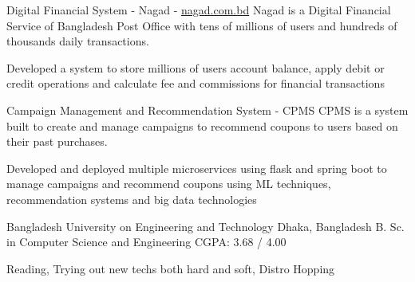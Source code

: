 \documentclass[10pt]{article}
\begin{document}
\headedsectionthree
{Digital Financial System - Nagad - {\href{https://nagad.com.bd/}{nagad.com.bd}}}{}
{Nagad is a Digital Financial Service of Bangladesh Post Office with tens of millions of users and hundreds of thousands daily transactions.}
{\vspace{-2.4ex}
\begin{circlist}	
	\item Developed a system to store millions of users account balance, apply debit or credit operations and calculate fee and commissions for financial transactions
\end{circlist}
\begin{indentsection}
\end{indentsection}
}
\headedsectionthree
{Campaign Management and Recommendation System - CPMS}{}
{CPMS is a system built to create and manage campaigns to recommend coupons to users based on their past purchases.}
{\vspace{-2.4ex}
\begin{circlist}	
	\item Developed and deployed multiple microservices using flask and spring boot to manage campaigns and recommend coupons using ML techniques, recommendation systems and big data technologies
\end{circlist}
\begin{indentsection}
\end{indentsection}
}


\spacedhrule{0.8ex}{0.0ex}

\headedsection
{Bangladesh University on Engineering and Technology}
{Dhaka, Bangladesh}
{B. Sc. in Computer Science and Engineering}
{}
{CGPA: 3.68 / 4.00}


\spacedhrule{0.8ex}{0.0ex}
Reading, Trying out new techs both hard and soft, Distro Hopping
\end{document}
